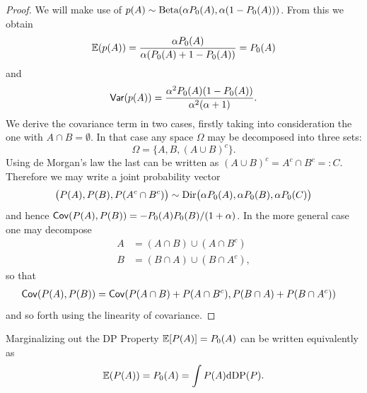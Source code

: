 \begin{proof}
We will make use of  $p(A)\sim \text{Beta}(\alpha P_0(A), \alpha (1-P_0(A)))$. From this we obtain 
\begin{equation*}
    \mathbb{E} (p(A)) = \frac{\alpha P_0(A)}{\alpha( P_0(A) + 1 - P_0(A) )} = P_0(A)
\end{equation*}
and 
\begin{equation*}
    \mathsf{Var}(p(A))=\frac{\alpha^2 P_0(A)( 1-P_0(A) )}{\alpha^2 (\alpha + 1)}.
\end{equation*}
We derive the covariance term in two cases, firstly taking into consideration the one with $A\cap B = \emptyset$. In that case any space $\Omega$ may be decomposed into three sets: 
$$
\Omega = \{A, B, (A\cup B)^c\}.
$$
Using de Morgan's law the last can be written as $(A\cup B)^c = A^c\cap B^c =: C$. Therefore we may write a joint probability vector
\begin{equation*}
    \big( P(A), P(B), P(A^c\cap B^c) \big)\sim \text{Dir}\big(\alpha P_0(A), \alpha P_0(B), \alpha P_0(C) \big)
\end{equation*}
and hence $\mathsf{Cov}(P(A), P(B)) = -P_0(A)P_0(B)/(1+\alpha) $. 
In the more general case one may decompose 
\begin{align*}
    A &= (A\cap B) \cup (A\cap B^c)\\
    B &= (B\cap A)\cup (B\cap A^c),
\end{align*}
so that 
\begin{equation*}
    \begin{split}
    \mathsf{Cov} (P(A), P(B)) &= \mathsf{Cov} (P(A\cap B) +P(A\cap B^c), P(B\cap A) + P(B\cap A^c) ) 
    \end{split}
\end{equation*}
and so forth using the linearity of covariance.
\end{proof}



{Marginalizing out the DP}
	Property $\mathbb{E}[ P(A)] = P_0(A)$ can be written equivalently as
\begin{equation*}
    \mathbb{E}( P(A)) = P_0(A) = \int P(A)\mathrm{d} \text{DP}(P). 
\end{equation*}

%

